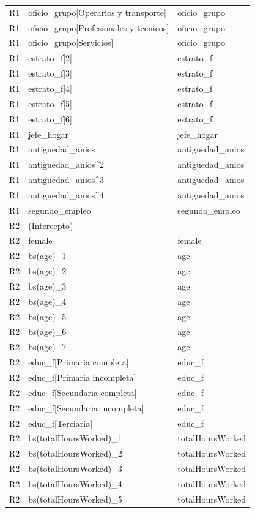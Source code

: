 \begin{longtable}{lll}
R1 & oficio\_grupo[Operarios y transporte] & oficio\_grupo \\
R1 & oficio\_grupo[Profesionales y tecnicos] & oficio\_grupo \\
R1 & oficio\_grupo[Servicios] & oficio\_grupo \\
R1 & estrato\_f[2] & estrato\_f \\
R1 & estrato\_f[3] & estrato\_f \\
R1 & estrato\_f[4] & estrato\_f \\
R1 & estrato\_f[5] & estrato\_f \\
R1 & estrato\_f[6] & estrato\_f \\
R1 & jefe\_hogar & jefe\_hogar \\
R1 & antiguedad\_anios & antiguedad\_anios \\
R1 & antiguedad\_anios\textasciicircum 2 & antiguedad\_anios \\
R1 & antiguedad\_anios\textasciicircum 3 & antiguedad\_anios \\
R1 & antiguedad\_anios\textasciicircum 4 & antiguedad\_anios \\
R1 & segundo\_empleo & segundo\_empleo \\
R2 & (Intercepto) &  \\
R2 & female & female \\
R2 & bs(age)\_1 & age \\
R2 & bs(age)\_2 & age \\
R2 & bs(age)\_3 & age \\
R2 & bs(age)\_4 & age \\
R2 & bs(age)\_5 & age \\
R2 & bs(age)\_6 & age \\
R2 & bs(age)\_7 & age \\
R2 & educ\_f[Primaria completa] & educ\_f \\
R2 & educ\_f[Primaria incompleta] & educ\_f \\
R2 & educ\_f[Secundaria completa] & educ\_f \\
R2 & educ\_f[Secundaria incompleta] & educ\_f \\
R2 & educ\_f[Terciaria] & educ\_f \\
R2 & bs(totalHoursWorked)\_1 & totalHoursWorked \\
R2 & bs(totalHoursWorked)\_2 & totalHoursWorked \\
R2 & bs(totalHoursWorked)\_3 & totalHoursWorked \\
R2 & bs(totalHoursWorked)\_4 & totalHoursWorked \\
R2 & bs(totalHoursWorked)\_5 & totalHoursWorked \\

\end{longtable}
